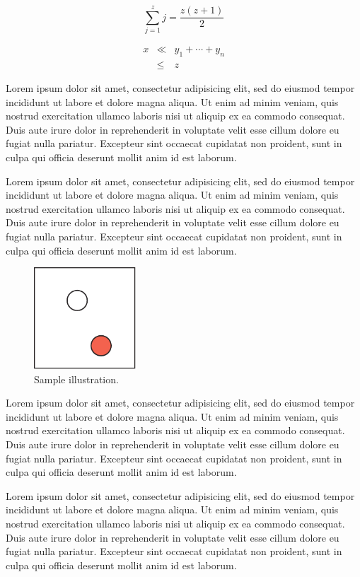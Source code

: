 \documentclass[conference]{acmsiggraph}
\begin{document}
\begin{equation}
 \sum_{j=1}^{z} j = \frac{z(z+1)}{2}
\end{equation}

\begin{eqnarray}
x & \ll & y_{1} + \cdots + y_{n} \\
  & \leq & z
\end{eqnarray}

Lorem ipsum dolor sit amet, consectetur adipisicing elit, sed do
eiusmod tempor incididunt ut labore et dolore magna aliqua. Ut enim ad
minim veniam, quis nostrud exercitation ullamco laboris nisi ut
aliquip ex ea commodo consequat. Duis aute irure dolor in
reprehenderit in voluptate velit esse cillum dolore eu fugiat nulla
pariatur. Excepteur sint occaecat cupidatat non proident, sunt in
culpa qui officia deserunt mollit anim id est laborum.


Lorem ipsum dolor sit amet, consectetur adipisicing elit, sed do
eiusmod tempor incididunt ut labore et dolore magna aliqua. Ut enim ad
minim veniam, quis nostrud exercitation ullamco laboris nisi ut
aliquip ex ea commodo consequat. Duis aute irure dolor in
reprehenderit in voluptate velit esse cillum dolore eu fugiat nulla
pariatur. Excepteur sint occaecat cupidatat non proident, sunt in
culpa qui officia deserunt mollit anim id est laborum.
\begin{figure}[ht]
  \centering
  \includegraphics[width=1.5in]{images/samplefigure}
  \caption{Sample illustration.}
\end{figure}
Lorem ipsum dolor sit amet, consectetur adipisicing elit, sed do
eiusmod tempor incididunt ut labore et dolore magna aliqua. Ut enim ad
minim veniam, quis nostrud exercitation ullamco laboris nisi ut
aliquip ex ea commodo consequat. Duis aute irure dolor in
reprehenderit in voluptate velit esse cillum dolore eu fugiat nulla
pariatur. Excepteur sint occaecat cupidatat non proident, sunt in
culpa qui officia deserunt mollit anim id est laborum.

Lorem ipsum dolor sit amet, consectetur adipisicing elit, sed do
eiusmod tempor incididunt ut labore et dolore magna aliqua. Ut enim ad
minim veniam, quis nostrud exercitation ullamco laboris nisi ut
aliquip ex ea commodo consequat. Duis aute irure dolor in
reprehenderit in voluptate velit esse cillum dolore eu fugiat nulla
pariatur. Excepteur sint occaecat cupidatat non proident, sunt in
culpa qui officia deserunt mollit anim id est laborum.
\end{document}
